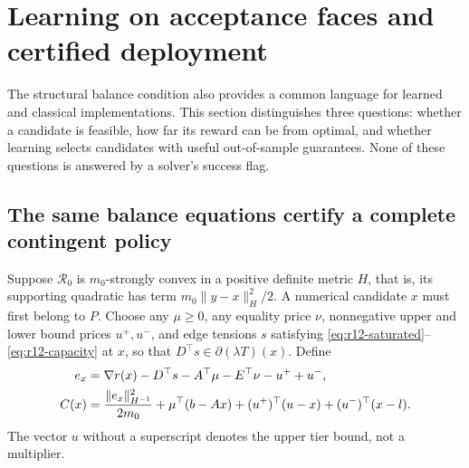 \section{Learning on acceptance faces and certified deployment}\label{sec:r12-bridge}
The structural balance condition also provides a common language for learned and classical implementations. This section distinguishes three questions: whether a candidate is feasible, how far its reward can be from optimal, and whether learning selects candidates with useful out-of-sample guarantees. None of these questions is answered by a solver's success flag.

\subsection{The same balance equations certify a complete contingent policy}
Suppose $\mathcal R_0$ is $m_0$-strongly convex in a positive definite metric $H$, that is, its supporting quadratic has term $m_0\|y-x\|_H^2/2$. A numerical candidate $x$ must first belong to $P$. Choose any $\mu\geq0$, any equality price $\nu$, nonnegative upper and lower bound prices $u^+,u^-$, and edge tensions $s$ satisfying \eqref{eq:r12-saturated}--\eqref{eq:r12-capacity} at $x$, so that $D^\top s\in\partial(\lambda T)(x)$. Define
\begin{align}
 e_x&=\nabla r(x)-D^\top s-A^\top\mu-E^\top\nu-u^++u^-,\notag\\
 C(x)&=\frac{\|e_x\|_{H^{-1}}^2}{2m_0}
    +\mu^\top(b-Ax)+(u^+)^\top(u-x)+(u^-)^\top(x-l).\label{eq:r12-certificate}
\end{align}
The vector $u$ without a superscript denotes the upper tier bound, not a multiplier.

